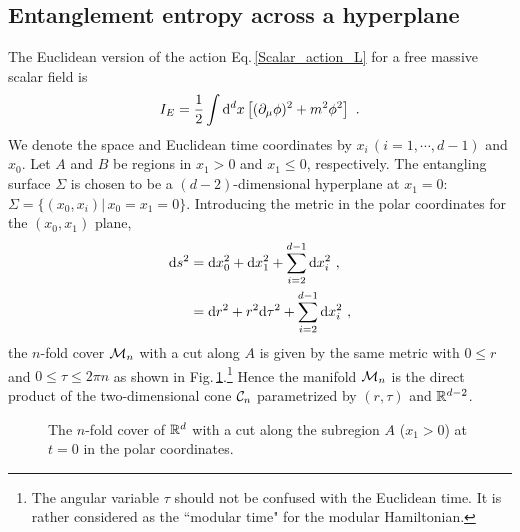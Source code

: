 \subsection{Entanglement entropy across a hyperplane}
The Euclidean version of the action Eq.\,\eqref{Scalar_action_L} for a free massive scalar field is
\begin{align}
I_E = \frac{1}{2}\int \mathrm{d}^d x \left[ (\partial_\mu \phi)^2 + m^2 \phi^2\right] \ .
\end{align}
We denote the space and Euclidean time coordinates by $x_i\, (i=1,\cdots, d-1)$ and $x_0$.
Let $A$ and $B$ be regions in $x_1> 0$ and $x_1\le0$, respectively.
The entangling surface $\Sigma$ is chosen to be a $(d-2)$-dimensional hyperplane at $x_1=0$: $\Sigma = \{ (x_0 ,x_i)|\, x_0 = x_1 = 0\}$.
Introducing the metric in the polar coordinates for the $(x_0 ,x_1)$ plane,
\begin{align}\label{EE_Hyperplane}
\begin{aligned}
\mathrm{d} s^2 &= \mathrm{d} x_0^2 + \mathrm{d} x_1^2  + \sum_{i=2}^{d-1} \mathrm{d} x_i^2 \ ,\\
 	&= \mathrm{d} r^2 + r^2 \mathrm{d}\tau^2 + \sum_{i=2}^{d-1} \mathrm{d} x_i^2 \ ,
\end{aligned}
\end{align}
the $n$-fold cover ${\cal M}_n$ with a cut along $A$ is given by the same metric with $0\le r$ and $0\le \tau \le 2\pi n$ as shown in Fig.\,\ref{fig:ScalarInfinite}.\footnote{The angular variable $\tau$ should not be confused with the Euclidean time. It is rather considered as the ``modular time" for the modular Hamiltonian.}
Hence the manifold ${\cal M}_n$ is the direct product of the two-dimensional cone ${\cal C}_n$ parametrized by $(r,\tau)$ and $\mathbb{R}^{d-2}$.
\begin{figure}[htbp]
\centering
{}
\caption{\label{fig:ScalarInfinite} The $n$-fold cover of $\mathbb{R}^d$ with a cut along the subregion $A$ ($x_1>0$) at $t=0$ in the polar coordinates.}
\end{figure}

